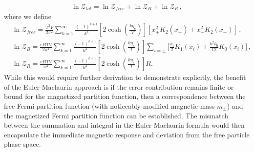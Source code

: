 \documentclass[Universe,article,submit,moreauthors,pdftex]{Definitions/mdpi}
\begin{document}
\begin{align}
  \ln\mathcal{Z}_{tot}=\ln\mathcal{Z}_{free}+\ln\mathcal{Z}_B+\ln\mathcal{Z}_R\,,
\end{align}
where we define 
\begin{align}
  \label{FreePart}&\ln\mathcal{Z}_{free}=\frac{T^3V}{2\pi^2}\sum^{\infty}_{k=1}\frac{(-1)^{k+1}}{k^4}\left[2\cosh{\left(\frac{k\eta_{e}}{T}\right)}\right]\left[x_+^2K_2\left(x_+\right)+x_-^2K_2\left(x_-\right)\right]\,,\\
  \label{MagPart}&\ln\mathcal{Z}_B=\frac{eBTV}{2\pi^2}\sum^{\infty}_{k=1}\frac{(-1)^{k+1}}{k^2}\left[2\cosh{\left(\frac{k\eta_{e}}{T}\right)}\right]\sum_{i=\pm}\bigg[\frac{x_i}{2}K_1\left(x_i\right)+\frac{k^2b_0}{12}K_0\left(x_i\right)\bigg]\,,\\
  \label{ErrorPart}&\ln\mathcal{Z}_R=\frac{eBTV}{\pi^2}\sum^{\infty}_{k=1}\frac{(-1)^{k+1}}{k^2}\left[2\cosh{\left(\frac{k\eta_{e}}{T}\right)}\right]R.
\end{align}
While this would require further derivation to demonstrate explicitly, the benefit of the Euler-Maclaurin approach is if the error contribution remains finite or bound for the magnetized partition function, then a correspondence between the free Fermi partition function (with noticeably modified magnetic-mass $\tilde{m}_{\pm}$) and the magnetized Fermi partition function can be established. The mismatch between the summation and integral in the Euler-Maclaurin formula would then encapsulate the immediate magnetic response and deviation from the free particle phase space.

\end{document}
